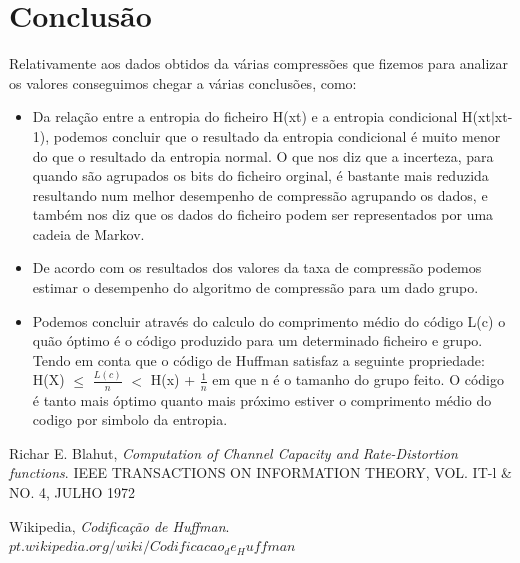 \section{Conclusão}

Relativamente aos dados obtidos da várias compressões que fizemos para analizar os valores conseguimos chegar a várias conclusões, como: 

{\bf }
\begin{itemize}
\item Da relação entre a entropia do ficheiro H(xt) e a entropia condicional H(xt$|$xt-1), podemos concluir que o resultado da entropia condicional é muito menor do que o resultado da entropia normal. O que nos diz que a incerteza, para quando são agrupados os bits do ficheiro orginal, é bastante mais reduzida resultando num melhor desempenho de compressão agrupando os dados, e também nos diz que os dados do ficheiro podem ser representados por uma cadeia de Markov.
\item De acordo com os resultados dos valores da taxa de compressão podemos estimar o desempenho do algoritmo de compressão para um dado grupo.
\item Podemos concluir através do calculo do comprimento médio do código L(c) o quão óptimo é o código produzido para um determinado ficheiro e grupo. Tendo em conta que o código de Huffman satisfaz a seguinte propriedade: H(X) $\leq$ $\frac{L(c)}{n}$ $<$ H(x) + $\frac{1}{n}$ em que n é o tamanho do grupo feito. O código é tanto mais óptimo quanto mais próximo estiver o comprimento médio do codigo por simbolo da entropia.  
\end{itemize}



\newpage


\begin{thebibliography}{9}

  Richar E. Blahut,
  \emph{Computation of Channel Capacity and Rate-Distortion functions}. IEEE TRANSACTIONS ON INFORMATION THEORY, VOL. IT-l \& NO. 4, JULHO 1972
  
  Wikipedia,
  \emph{Codificação de Huffman}. $pt.wikipedia.org/wiki/Codificacao_de_Huffman$

\end{thebibliography}


